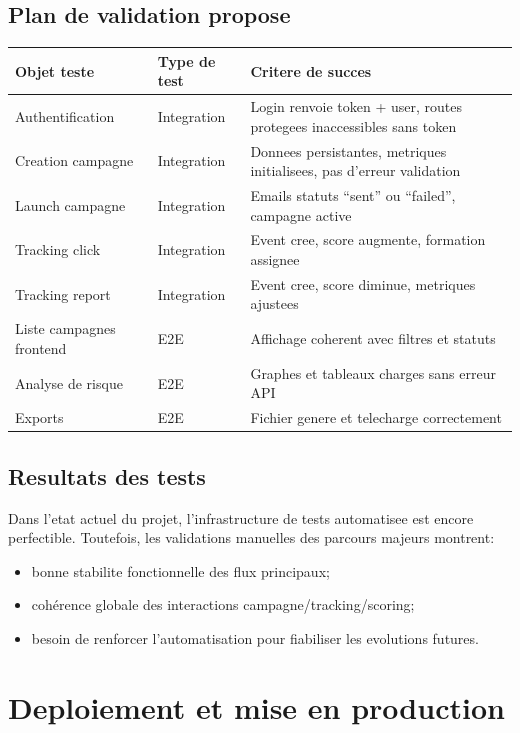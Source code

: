\documentclass[12pt,a4paper,oneside]{report}
\begin{document}
\section{Plan de validation propose}
\begin{longtable}{p{5cm} p{4cm} p{5cm}}
\toprule
\textbf{Objet teste} & \textbf{Type de test} & \textbf{Critere de succes} \\
\midrule
\endhead
Authentification & Integration & Login renvoie token + user, routes protegees inaccessibles sans token \\
Creation campagne & Integration & Donnees persistantes, metriques initialisees, pas d'erreur validation \\
Launch campagne & Integration & Emails statuts ``sent'' ou ``failed'', campagne active \\
Tracking click & Integration & Event cree, score augmente, formation assignee \\
Tracking report & Integration & Event cree, score diminue, metriques ajustees \\
Liste campagnes frontend & E2E & Affichage coherent avec filtres et statuts \\
Analyse de risque & E2E & Graphes et tableaux charges sans erreur API \\
Exports & E2E & Fichier genere et telecharge correctement \\
\bottomrule
\end{longtable}

\section{Resultats des tests}
Dans l'etat actuel du projet, l'infrastructure de tests automatisee est encore perfectible. Toutefois, les validations manuelles des parcours majeurs montrent:
\begin{itemize}[leftmargin=1.2cm]
  \item bonne stabilite fonctionnelle des flux principaux;
  \item cohérence globale des interactions campagne/tracking/scoring;
  \item besoin de renforcer l'automatisation pour fiabiliser les evolutions futures.
\end{itemize}

\chapter{Deploiement et mise en production}
\end{document}
